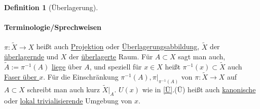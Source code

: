 \documentclass[a4paper,11pt,notitlepage]{report}
\theoremstyle{remark}
\theoremstyle{definition}
\newtheorem{definition}{Definition}[chapter]
\begin{document}
\begin{definition}[Überlagerung]
	\paragraph{Terminologie/Sprechweisen} $\pi \colon \tilde{X} \rightarrow X$ heißt auch \underline{Projektion} oder \underline{Überlagerungsabbildung}, $\tilde{X}$ der \underline{überlagernde} und $X$ der \underline{überlagerte} Raum.
	Für $A \subset X$ sagt man auch, $\tilde{A} := \pi^{-1}(A)$ \underline{liege} über $A$, und speziell für $x \in X$ heißt $\pi^{-1}(x) \subset \tilde{X}$ auch \underline{Faser über $x$}. Für die Einschränkung $\pi^{-1}(A), \pi \big |_{\pi^{-1}(A)}$ von $\pi \colon \tilde{X} \rightarrow X$ auf $A \subset X$ schreibt man auch kurz $\tilde{X} \big |_A$.
	\newline
	$U(x)$ wie in \ref{Ü}.(Ü) heißt auch \underline{kanonische} oder \underline{lokal trivialisierende} Umgebung von $x$.
\end{definition}
\end{document}
